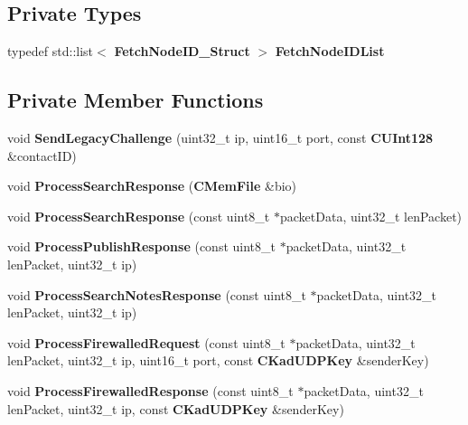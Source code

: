 \subsection*{Private Types}
\begin{DoxyCompactItemize}
\item 
typedef std::list$<$ {\bf FetchNodeID\_\-Struct} $>$ {\bfseries FetchNodeIDList}\label{classKademlia_1_1CKademliaUDPListener_a4a695e6a15f14705085613e2cfccc8e5}

\end{DoxyCompactItemize}
\subsection*{Private Member Functions}
\begin{DoxyCompactItemize}
\item 
void {\bfseries SendLegacyChallenge} (uint32\_\-t ip, uint16\_\-t port, const {\bf CUInt128} \&contactID)\label{classKademlia_1_1CKademliaUDPListener_ad3f4da4d75c8fcccd2f61570f0558e11}

\item 
void {\bfseries ProcessSearchResponse} ({\bf CMemFile} \&bio)\label{classKademlia_1_1CKademliaUDPListener_a25f5ee1917bf890f1e177d92c4d8f224}

\item 
void {\bfseries ProcessSearchResponse} (const uint8\_\-t $\ast$packetData, uint32\_\-t lenPacket)\label{classKademlia_1_1CKademliaUDPListener_adc7a5ebe69f682b45aa0712443d6a65f}

\item 
void {\bfseries ProcessPublishResponse} (const uint8\_\-t $\ast$packetData, uint32\_\-t lenPacket, uint32\_\-t ip)\label{classKademlia_1_1CKademliaUDPListener_a2547d7bb9630ef1690c5b3c0fb18ea50}

\item 
void {\bfseries ProcessSearchNotesResponse} (const uint8\_\-t $\ast$packetData, uint32\_\-t lenPacket, uint32\_\-t ip)\label{classKademlia_1_1CKademliaUDPListener_a8316278548df40a7491a774e69cb7f15}

\item 
void {\bfseries ProcessFirewalledRequest} (const uint8\_\-t $\ast$packetData, uint32\_\-t lenPacket, uint32\_\-t ip, uint16\_\-t port, const {\bf CKadUDPKey} \&senderKey)\label{classKademlia_1_1CKademliaUDPListener_abca55631e446976a8afbe49631415035}

\item 
void {\bfseries ProcessFirewalledResponse} (const uint8\_\-t $\ast$packetData, uint32\_\-t lenPacket, uint32\_\-t ip, const {\bf CKadUDPKey} \&senderKey)\label{classKademlia_1_1CKademliaUDPListener_a4903eea970ebb75bc6345bd1745e70e0}


\end{DoxyCompactItemize}
